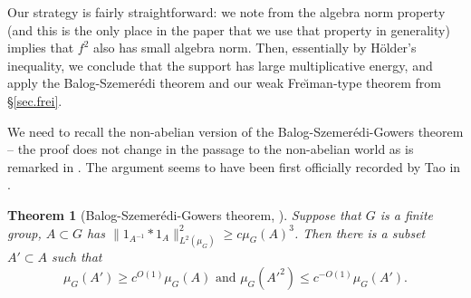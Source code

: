 \documentclass[12pt]{amsart}
\numberwithin{equation}{section}
\theoremstyle{plain}
\newtheorem{theorem}[subsection]{Theorem}
\theoremstyle{definition}
\renewcommand{\leq}{\leqslant}
\renewcommand{\geq}{\geqslant}
\begin{document}
Our strategy is fairly straightforward: we note from the algebra norm property (and this is the only place in the paper that we use that property in generality) implies that $f^2$ also has small algebra norm.  Then, essentially by H{\"o}lder's inequality, we conclude that the support has large multiplicative energy, and apply the Balog-Szemer{\'e}di theorem and our weak Fre{\u\i}man-type theorem from \S\ref{sec.frei}.

We need to recall the non-abelian version of the Balog-Szemer{\'e}di-Gowers theorem -- the proof does not change in the passage to the non-abelian world as is remarked in \cite{TCTVHV}.  The argument seems to have been first officially recorded by Tao in \cite{TCTNC}.
\begin{theorem}[{Balog-Szemer{\'e}di-Gowers theorem, \cite[Theorem 5.4]{TCTNC}}]
Suppose that $G$ is a finite group, $A \subset G$ has $\|1_{A^{-1}}\ast 1_{A}\|_{L^2(\mu_G)}^2\geq c\mu_G(A)^3$.  Then there is a subset $A' \subset A$ such that
\begin{equation*}
\mu_G(A') \geq c^{O(1)}\mu_G(A) \textrm{ and } \mu_G(A'^2) \leq c^{-O(1)}\mu_G(A').
\end{equation*}
\end{theorem}
\end{document}
